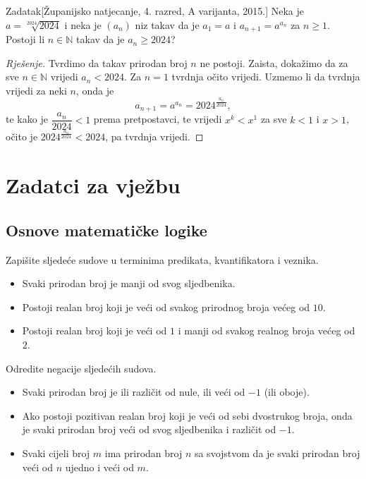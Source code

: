 \begin{exercise}{Zadatak}[Županijsko natjecanje, 4. razred, A varijanta, 2015.]
Neka je \(a=\sqrt[2024]{2024}\) i neka je \((a_n)\) niz takav da je \(a_1=a\) i \(a_{n+1}=a^{a_n}\) za \(n\geq 1\). Postoji li \(n\in \mathbb{N}\) takav da je \(a_n\geq 2024\)?
\end{exercise}
\begin{proof}[Rješenje]
Tvrdimo da takav prirodan broj \(n\) ne postoji. Zaista, dokažimo da za sve \(n\in \mathbb{N}\) vrijedi \(a_n<2024\). Za \(n=1\) tvrdnja očito vrijedi. Uzmemo li da tvrdnja vrijedi za neki \(n\), onda je \[a_{n+1}=a^{a_n}=2024^{\frac{a_n}{2024}},\] 
te kako je \(\dfrac{a_n}{2024}<1\) prema pretpostavci, te vrijedi \(x^k<x^1\) za sve \(k<1\) i \(x>1\), očito je \(2024^{\frac{a_n}{2024}}<2024\), pa tvrdnja vrijedi.
\end{proof}
\newpage
\section*{Zadatci za vježbu}
\subsection*{Osnove matematičke logike}
\begin{exercise}{\unskip} Zapišite sljedeće sudove u terminima predikata, kvantifikatora i veznika.
\begin{itemize}
\item[a)] Svaki prirodan broj je manji od svog sljedbenika.
\item[b)] Postoji realan broj koji je veći od svakog prirodnog broja većeg od $10$.
\item[c)] Postoji realan broj koji je veći od $1$ i manji od svakog realnog broja većeg od $2$.
\end{itemize}
\end{exercise}
\begin{exercise}{\unskip}
Odredite negacije sljedećih sudova.
\begin{itemize}
\item[a)] Svaki prirodan broj je ili različit od nule, ili veći od $-1$ (ili oboje).
\item[b)] Ako postoji pozitivan realan broj koji je veći od sebi dvostrukog broja, onda je svaki prirodan broj veći od svog sljedbenika i različit od $-1$.
\item[c)] Svaki cijeli broj $m$ ima prirodan broj $n$ sa svojstvom da je svaki prirodan broj veći od $n$ ujedno i veći od $m$.
\end{itemize}
\end{exercise}
